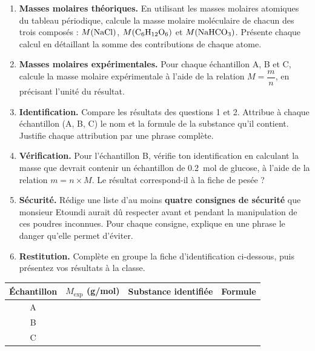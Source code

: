 \documentclass[11pt]{article}
\newcounter{popsec}
\newcounter{popsub}
\newcommand{\courssub}[1]{%
  \stepcounter{popsub}%
  \par\vspace{9pt}\noindent{\popxbold\fontsize{11.5}{13}\selectfont\color{popink}{\color{poporange}\thepopsec.\thepopsub}\hspace{6pt}#1}\par\nopagebreak\vspace{4pt}
}
\begin{document}
\begin{enumerate}
\item \textbf{Masses molaires théoriques.} En utilisant les masses molaires atomiques du tableau périodique, calcule la masse molaire moléculaire de chacun des trois composés : $M(\ce{NaCl})$, $M(\ce{C6H12O6})$ et $M(\ce{NaHCO3})$. Présente chaque calcul en détaillant la somme des contributions de chaque atome.
\item \textbf{Masses molaires expérimentales.} Pour chaque échantillon A, B et C, calcule la masse molaire expérimentale à l'aide de la relation $M = \dfrac{m}{n}$, en précisant l'unité du résultat.
\item \textbf{Identification.} Compare les résultats des questions 1 et 2. Attribue à chaque échantillon (A, B, C) le nom et la formule de la substance qu'il contient. Justifie chaque attribution par une phrase complète.
\item \textbf{Vérification.} Pour l'échantillon B, vérifie ton identification en calculant la masse que devrait contenir un échantillon de \SI{0,2}{mol} de glucose, à l'aide de la relation $m = n \times M$. Le résultat correspond-il à la fiche de pesée ?
\item \textbf{Sécurité.} Rédige une liste d'au moins \textbf{quatre consignes de sécurité} que monsieur Etoundi aurait dû respecter avant et pendant la manipulation de ces poudres inconnues. Pour chaque consigne, explique en une phrase le danger qu'elle permet d'éviter.
\item \textbf{Restitution.} Complète en groupe la fiche d'identification ci-dessous, puis présentez vos résultats à la classe.
\end{enumerate}

\begin{center}
\begin{tabularx}{\linewidth}{|c|X|X|X|}
\hline
\rowcolor{popblueL} \textbf{Échantillon} & \textbf{$M_{\text{exp}}$ (g/mol)} & \textbf{Substance identifiée} & \textbf{Formule} \\
\hline
A & & & \\
\hline
B & & & \\
\hline
C & & & \\
\hline
\end{tabularx}
\end{center}

\courssub{Ressources à mobiliser}
\end{document}
